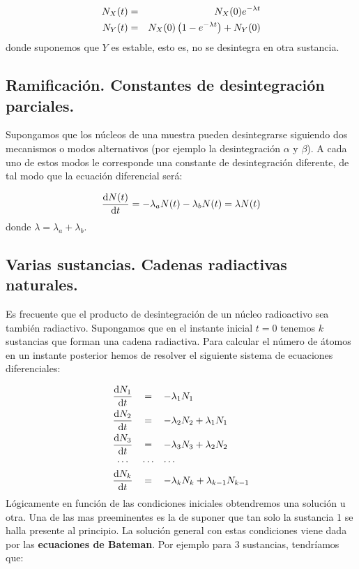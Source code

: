 \begin{eqnarray}
	N_X (t) & = & N_X(0) e^{-\lambda t} \\
	N_Y (t) & = & N_X(0) \left( 1-e^{-\lambda t} \right) + N_Y(0)
\end{eqnarray}
donde suponemos que $Y$ es estable, esto es, no se desintegra en otra sustancia.

\subsection{Ramificación. Constantes de desintegración parciales.}

Supongamos que los núcleos de una muestra pueden desintegrarse siguiendo dos mecanismos o modos alternativos (por ejemplo la desintegración $\alpha$ y $\beta$). A cada uno de estos modos le corresponde una constante de desintegración diferente, de tal modo que la ecuación diferencial será:

\begin{eqnarray}
	\frac{\mathrm{d} N(t)}{\mathrm{d} t} = - \lambda_a N(t) - \lambda_b N(t) = \lambda N(t)
\end{eqnarray}
donde $\lambda = \lambda_a + \lambda_b$. 

\subsection{Varias sustancias. Cadenas radiactivas naturales.}

Es frecuente que el producto de desintegración de un núcleo radioactivo sea también radiactivo. Supongamos que en el instante inicial $t=0$ tenemos $k$ sustancias que forman una cadena radiactiva. Para calcular el número de átomos en un instante posterior hemos de resolver el siguiente sistema de ecuaciones diferenciales:

\begin{equation}
	\begin{array}{ccl}
		\dfrac{\D N_1}{\D t} & = & - \lambda_1 N_1 \vspace{1.5mm} \\ \vspace{1.5mm}
		\dfrac{\D N_2}{\D t} & = & - \lambda_2 N_2 + \lambda_1 N_1 \\
		\dfrac{\D N_3}{\D t} & = & - \lambda_3 N_3 + \lambda_2 N_2\\\vspace{1.5mm}
					\ldots & \ldots &  \ldots \\					 
		\dfrac{\D N_k}{\D t} & = & - \lambda_k N_k  + \lambda_{k-1} N_{k-1}
	\end{array}
\end{equation}
Lógicamente en función de las condiciones iniciales obtendremos una solución u otra. Una de las mas preeminentes es la de suponer que tan solo la sustancia 1 se halla presente al principio. La solución general con estas condiciones viene dada por las \textbf{ecuaciones de Bateman}. Por ejemplo para 3 sustancias, tendríamos que:

